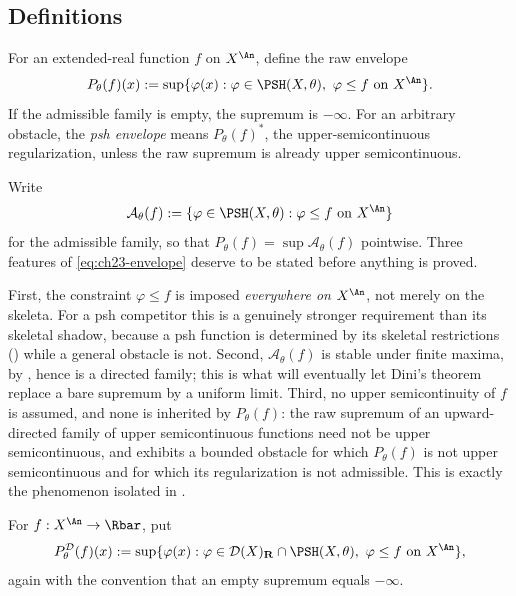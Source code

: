 \subsection{Definitions}
\label{sec:ch23-definitions}

\begin{definition}\label{def:ch23-envelope}
For an extended-real function \(f\) on \(X^{\An}\), define the raw envelope
\begin{equation}\label{eq:ch23-envelope}
 P_\theta(f)(x)
 :=\sup\{\varphi(x):
          \varphi\in\PSH(X,\theta),\ \varphi\leq f\text{ on }X^{\An}\}.
\end{equation}
If the admissible family is empty, the supremum is \(-\infty\).  For an
arbitrary obstacle, the \emph{psh envelope} means
\(P_\theta(f)^*\), the upper-semicontinuous regularization, unless the raw
supremum is already upper semicontinuous.
\end{definition}

Write
\begin{equation}\label{eq:ch23-admissible-family}
 \mathcal A_\theta(f)
 :=\{\varphi\in\PSH(X,\theta):\varphi\leq f\text{ on }X^{\An}\}
\end{equation}
for the admissible family, so that \(P_\theta(f)=\sup\mathcal A_\theta(f)\)
pointwise.  Three features of \eqref{eq:ch23-envelope} deserve to be stated
before anything is proved.

First, the constraint \(\varphi\leq f\) is imposed \emph{everywhere on
\(X^{\An}\)}, not merely on the skeleta.  For a psh competitor this is a
genuinely stronger requirement than its skeletal shadow, because a psh
function is determined by its skeletal restrictions
() while a general obstacle is not.
Second, \(\mathcal A_\theta(f)\) is stable under finite maxima, by
, hence is a directed family; this is
what will eventually let Dini's theorem replace a bare supremum by a uniform
limit.  Third, no upper semicontinuity of \(f\) is assumed, and none is
inherited by \(P_\theta(f)\): the raw supremum of an upward-directed family
of upper semicontinuous functions need not be upper semicontinuous, and
 exhibits a bounded obstacle for
which \(P_\theta(f)\) is not upper semicontinuous and for which its
regularization is not admissible.  This is exactly the phenomenon isolated in
.

\begin{definition}
\label{def:ch23-model-envelope}
For \(f:X^{\An}\to\Rbar\), put
\begin{equation}\label{eq:ch23-model-envelope}
 P^{\mathcal D}_\theta(f)(x)
 :=\sup\{\varphi(x):
   \varphi\in\mathcal D(X)_{\mathbf R}\cap\PSH(X,\theta),\
   \varphi\leq f\text{ on }X^{\An}\},
\end{equation}
again with the convention that an empty supremum equals \(-\infty\).
\end{definition}

